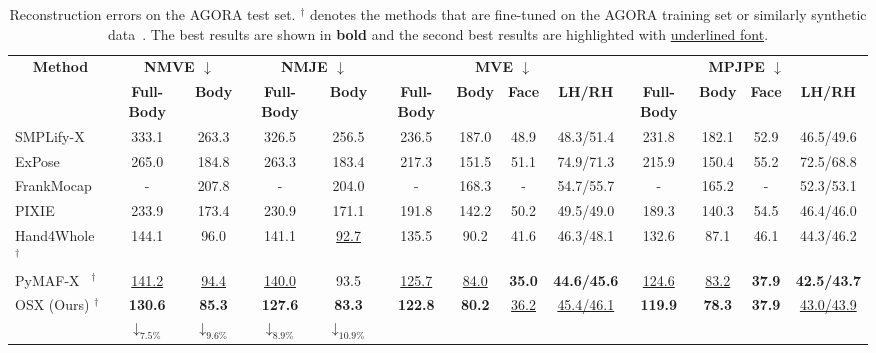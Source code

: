 \documentclass[10pt,twocolumn,letterpaper]{article}
\begin{document}
\begin{table*}[h]
  \centering
  \resizebox{\textwidth}{!}
{
    \begin{tabular}{l|cc|cc|cccc|cccc}
    \toprule
    \multicolumn{1}{c|}{\multirow{2}[4]{*}{\textbf{Method}}}  & \multicolumn{2}{c|}{\boldmath{}\textbf{NMVE $\downarrow$}} & 
    \multicolumn{2}{c|}{\boldmath{}\textbf{NMJE $\downarrow$}} & 
    \multicolumn{4}{c|}{\boldmath{}\textbf{MVE $\downarrow$}\unboldmath{}} & \multicolumn{4}{c}{\boldmath{}\textbf{MPJPE $\downarrow$}\unboldmath{}} \\
    \cmidrule{2-13} & \textbf{Full-Body} & \textbf{Body} & \textbf{Full-Body} & \textbf{Body} &
    \textbf{Full-Body} & \textbf{Body} & \textbf{Face} & \textbf{LH/RH} & \textbf{Full-Body} & \textbf{Body} & \textbf{Face} & \textbf{LH/RH} \\
    \midrule
    SMPLify-X~\cite{Pavlakos_2019smplx} & 333.1  & 263.3 & 326.5 & 256.5 & 236.5 &187.0 & 48.9  & 48.3/51.4 & 231.8 & 182.1 & 52.9  & 46.5/49.6 \\
    ExPose~\cite{PavlakosGeorgios2020expose} & 265.0 & 184.8 &263.3 & 183.4  & 217.3 & 151.5 & 51.1  & 74.9/71.3 & 215.9 & 150.4 & 55.2  & 72.5/68.8 \\
    FrankMocap~\cite{Rong_2021frank} & - & 207.8 & - & 204.0  & - & 168.3 & -     & 54.7/55.7 & -     & 165.2 & -     & 52.3/53.1 \\
    PIXIE~\cite{Feng_2021_pixie} &  233.9 & 173.4 & 230.9 & 171.1  & 191.8 & 142.2 & 50.2  & 49.5/49.0 & 189.3 & 140.3 & 54.5  & 46.4/46.0 \\
    Hand4Whole~\cite{GyeongsikMoon2020hand4whole} $^\dagger$ & 144.1 & 96.0 & 141.1 & \underline{92.7} & 135.5 & 90.2  & 41.6  & 46.3/48.1 & 132.6 & 87.1  & 46.1  & 44.3/46.2 \\
    PyMAF-X~\cite{HongwenZhang2022PyMAFXTW} $^\dagger$ & \underline{141.2} & \underline{94.4} & \underline{140.0} & 93.5 & \underline{125.7} & \underline{84.0} & \textbf{35.0} & \textbf{44.6/45.6} & \underline{124.6} & \underline{83.2} & \textbf{37.9} & \textbf{42.5/43.7} \\
    \midrule
    OSX (Ours) $^\dagger$ & \textbf{130.6}{\color{Red}$\downarrow_{7.5\%}$} & \textbf{85.3}{\color{Red}$\downarrow_{9.6\%}$} & \textbf{127.6}{\color{Red}$\downarrow_{8.9\%}$} & \textbf{83.3}{\color{Red}$\downarrow_{10.9\%}$} & \textbf{122.8} & \textbf{80.2} & \underline{36.2} & \underline{45.4/46.1} & \textbf{119.9} & \textbf{78.3} & \textbf{37.9} & \underline{43.0/43.9}  \\
    \bottomrule
    \end{tabular}}
  \caption[Reconstruction errors on the AGORA val set.]{Reconstruction errors on the AGORA test set. $^\dagger$ denotes the methods that are fine-tuned on the AGORA training set or similarly synthetic data~\cite{kocabas2021spec}. The best results are shown in \textbf{bold} and the second best results are highlighted with \underline{underlined font}.}
  \label{tab:agora_test}\end{table*}
\end{document}
